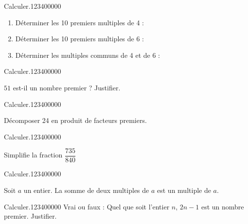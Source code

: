 \begin{pageAD} 
 


\begin{ExoCad}{Calculer.}{1234}{0}{0}{0}{0}{0}
\begin{enumerate}
\item Déterminer les 10 premiers multiples de 4 : 
\item Déterminer les 10 premiers multiples de 6 : 
\item Déterminer les multiples communs de 4 et de 6 : 
\end{enumerate}
\end{ExoCad}


\begin{ExoCad}{Calculer.}{1234}{0}{0}{0}{0}{0}

$51$ est-il un nombre premier ? Justifier. 


\end{ExoCad}


\begin{ExoCad}{Calculer.}{1234}{0}{0}{0}{0}{0}

Décomposer 24 en produit de facteurs premiers.


\end{ExoCad}



\begin{ExoCad}{Calculer.}{1234}{0}{0}{0}{0}{0}

Simplifie la fraction $\dfrac{735}{840}$ 


\end{ExoCad}



\begin{ExoCad}{Calculer.}{1234}{0}{0}{0}{0}{0}

Soit $a$ un entier. La somme de deux multiples de $a$ est un multiple de $a$. 

\end{ExoCad}


\begin{ExoCad}{Calculer.}{1234}{0}{0}{0}{0}{0}
Vrai ou faux : Quel que soit l'entier $n$, $2n-1$ est un nombre premier. Justifier.
\end{ExoCad}



\end{pageAD}
